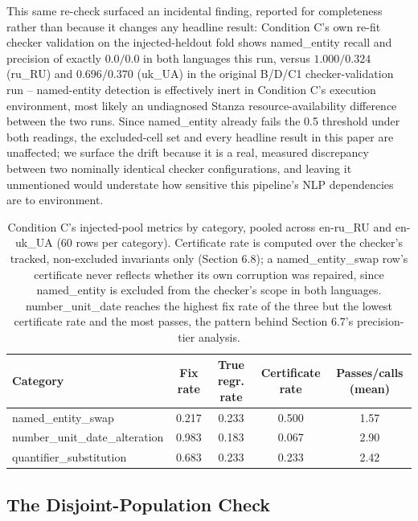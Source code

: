\documentclass[11pt,letterpaper]{article}
\begin{document}
This same re-check surfaced an incidental finding, reported for completeness rather than because it changes any headline result: Condition C's own re-fit checker validation on the injected-heldout fold shows named\_entity recall and precision of exactly $0.0/0.0$ in both languages this run, versus $1.000/0.324$ (ru\_RU) and $0.696/0.370$ (uk\_UA) in the original B/D/C1 checker-validation run -- named-entity detection is effectively inert in Condition C's execution environment, most likely an undiagnosed Stanza resource-availability difference between the two runs. Since named\_entity already fails the 0.5 threshold under both readings, the excluded-cell set and every headline result in this paper are unaffected; we surface the drift because it is a real, measured discrepancy between two nominally identical checker configurations, and leaving it unmentioned would understate how sensitive this pipeline's NLP dependencies are to environment.

\begin{table}[!htbp]
\centering
\small
\begin{tabular}{lcccc}
\toprule
Category & Fix rate & True regr. rate & Certificate rate & Passes/calls (mean) \\
\midrule
named\_entity\_swap & 0.217 & 0.233 & 0.500 & 1.57 \\
number\_unit\_date\_alteration & 0.983 & 0.183 & 0.067 & 2.90 \\
quantifier\_substitution & 0.683 & 0.233 & 0.233 & 2.42 \\
\bottomrule
\end{tabular}
\caption{Condition C's injected-pool metrics by category, pooled across en-ru\_RU and en-uk\_UA (60 rows per category). Certificate rate is computed over the checker's tracked, non-excluded invariants only (Section 6.8); a named\_entity\_swap row's certificate never reflects whether its own corruption was repaired, since named\_entity is excluded from the checker's scope in both languages. number\_unit\_date reaches the highest fix rate of the three but the lowest certificate rate and the most passes, the pattern behind Section 6.7's precision-tier analysis.}
\label{tab:categorybreakdown}
\end{table}

\subsection{The Disjoint-Population Check}
\end{document}
